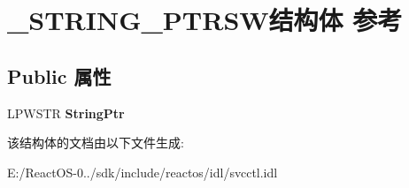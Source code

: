 \hypertarget{struct___s_t_r_i_n_g___p_t_r_s_w}{}\section{\+\_\+\+S\+T\+R\+I\+N\+G\+\_\+\+P\+T\+R\+S\+W结构体 参考}
\label{struct___s_t_r_i_n_g___p_t_r_s_w}
\subsection*{Public 属性}
\begin{DoxyCompactItemize}
\item 
\mbox{\label{struct___s_t_r_i_n_g___p_t_r_s_w_aa6740966b383d310b6904bddb1da3366}} 
L\+P\+W\+S\+TR {\bfseries String\+Ptr}
\end{DoxyCompactItemize}


该结构体的文档由以下文件生成\+:\begin{DoxyCompactItemize}
\item 
E\+:/\+React\+O\+S-\/0../sdk/include/reactos/idl/svcctl.\+idl\end{DoxyCompactItemize}

